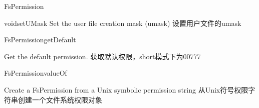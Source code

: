 \begin{XeClass}{FsPermission}
\begin{XeMethod}{\XePublic}{void}{setUMask}
 Set the user file creation mask (umask)
 设置用户文件的umask

    \end{XeMethod}

    \begin{XeMethod}{\XePublic}{FsPermission}{getDefault}
         
 Get the default permission.
 获取默认权限，short模式下为00777

    \end{XeMethod}

    \begin{XeMethod}{\XePublic}{FsPermission}{valueOf}
         
 Create a FsPermission from a Unix symbolic permission string
 从Unix符号权限字符串创建一个文件系统权限对象

    \end{XeMethod}

\end{XeClass}
